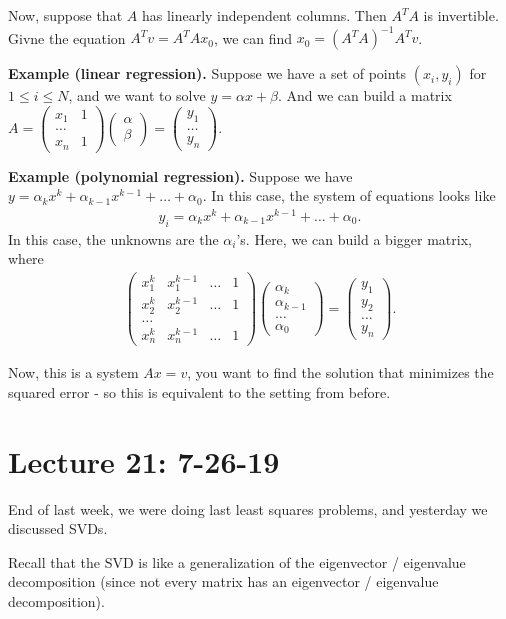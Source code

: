 \documentclass{article}
\newcommand{\mat}[1]{\begin{pmatrix}#1\end{pmatrix}}
\begin{document}
Now, suppose that $A$ has linearly independent columns.  Then $A^T A$ is invertible.  Givne the equation $A^T v = A^T A x_0$, we can find $x_0 = (A^T A)^{-1} A^T v$.

{\bf Example (linear regression).} Suppose we have a set of points $\left( x_i, y_i \right)$ for $1 \leq i \leq N$, and we want to solve $y = \alpha x + \beta$.  And we can build a matrix $A = \mat{x_1 & 1 \\ \dots \\ x_n & 1} \mat{\alpha \\ \beta} = \mat{y_1 \\ \dots \\ y_n}$.

{\bf Example (polynomial regression).} Suppose we have $y = \alpha_k x^k + \alpha_{k-1} x^{k-1} + \dots + \alpha_0$.  In this case, the system of equations looks like
\begin{align*}
  y_i = \alpha_k x^k + \alpha_{k-1} x^{k-1} + \dots + \alpha_0.
\end{align*}
In this case, the unknowns are the $\alpha_i$'s.  Here, we can build a bigger matrix, where
\begin{align*}
  \mat{x_1^k & x_1^{k-1} & \dots & 1 \\ x_2^k & x_2^{k-1} & \dots & 1 \\ \dots \\ x_n^k & x_n^{k-1} & \dots & 1} \mat{\alpha_k \\ \alpha_{k-1} \\ \dots \\ \alpha_0} = \mat{y_1 \\ y_2 \\ \dots \\ y_n}.
\end{align*}

Now, this is a system $Ax = v$, you want to find the solution that minimizes the squared error - so this is equivalent to the setting from before.




\section{Lecture 21: 7-26-19}

End of last week, we were doing last least squares problems, and yesterday we discussed SVDs.

Recall that the SVD is like a generalization of the eigenvector / eigenvalue decomposition (since not every matrix has an eigenvector / eigenvalue decomposition).
\end{document}
